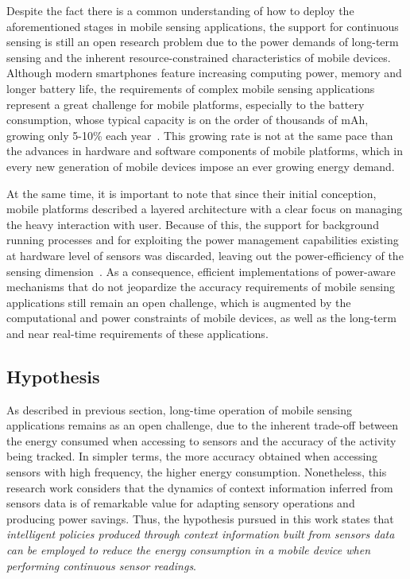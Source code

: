 \documentclass[ENG,PhD]{cinvestav}
\begin{document}
Despite the fact there is a common understanding of how to deploy the aforementioned stages in mobile sensing applications, the support for continuous sensing is still an open research problem due to the power demands of long-term sensing and the inherent resource-constrained characteristics of mobile devices.
Although modern smartphones feature increasing computing power, memory and longer battery life, the requirements of complex mobile sensing applications represent a great challenge for mobile platforms, especially to the battery consumption, whose typical capacity is on the order of thousands of mAh, growing only 5-10\% each year~\cite{Ma2012,Evarts2015}. 
This growing rate is not at the same pace than the advances in hardware and software components of mobile platforms, which in every new generation of mobile devices impose an ever growing energy demand.

At the same time, it is important to note that since their initial conception, mobile platforms described a layered architecture with a clear focus on managing the heavy interaction with user.
Because of this, the support for background running processes and for exploiting the power management capabilities existing at hardware level of sensors was discarded, leaving out the power-efficiency of the sensing dimension~\cite{Priyantha2011}.
As a consequence, efficient implementations of power-aware mechanisms that do not jeopardize the accuracy requirements of mobile sensing applications still remain an open challenge, which is augmented by the computational and power constraints of mobile devices, as well as the long-term and near real-time requirements of these applications.


\subsection{Hypothesis} 
\label{sub:hypothesis}
As described in previous section, long-time operation of mobile sensing applications remains as an open challenge, due to the inherent trade-off between the energy consumed when accessing to sensors and the accuracy of the activity being tracked.
In simpler terms, the more accuracy obtained when accessing sensors with high frequency, the higher energy consumption.
Nonetheless, this research work considers that the dynamics of context information inferred from sensors data is of remarkable value for adapting sensory operations and producing power savings.
Thus, the hypothesis pursued in this work states that \emph{intelligent policies produced through context information built from sensors data can be employed to reduce the energy consumption in a mobile device when performing continuous sensor readings}.
\end{document}
